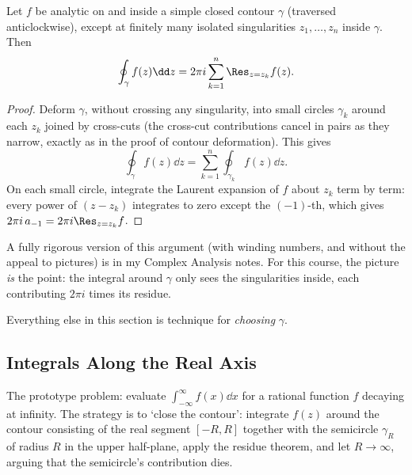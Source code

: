 \begin{theorem}
	Let $f$ be analytic on and inside a simple closed contour $\gamma$ (traversed anticlockwise), except at finitely many isolated singularities $z_1, \dots, z_n$ inside $\gamma$. Then
	$$
	\oint_\gamma f(z) \dd z = 2\pi i \sum_{k = 1}^n \Res_{z = z_k} f(z).
	$$
\end{theorem}
\begin{proof}
	Deform $\gamma$, without crossing any singularity, into small circles $\gamma_k$ around each $z_k$ joined by cross-cuts (the cross-cut contributions cancel in pairs as they narrow, exactly as in the proof of contour deformation). This gives
	$$
	\oint_\gamma f(z) \dd z = \sum_{k=1}^n \oint_{\gamma_k} f(z) \dd z.
	$$
	On each small circle, integrate the Laurent expansion of $f$ about $z_k$ term by term: every power of $(z - z_k)$ integrates to zero except the $(-1)$-th, which gives $2\pi i \, a_{-1} = 2\pi i \Res_{z = z_k} f$.
\end{proof}

A fully rigorous version of this argument (with winding numbers, and without the appeal to pictures) is in my Complex Analysis notes. For this course, the picture \emph{is} the point: the integral around $\gamma$ only sees the singularities inside, each contributing $2\pi i$ times its residue.

Everything else in this section is technique for \emph{choosing} $\gamma$.

\subsection{Integrals Along the Real Axis}

The prototype problem: evaluate $\int_{-\infty}^\infty f(x) \dd x$ for a rational function $f$ decaying at infinity. The strategy is to `close the contour': integrate $f(z)$ around the contour consisting of the real segment $[-R, R]$ together with the semicircle $\gamma_R$ of radius $R$ in the upper half-plane, apply the residue theorem, and let $R \to \infty$, arguing that the semicircle's contribution dies.

\begin{center}
\end{center}


